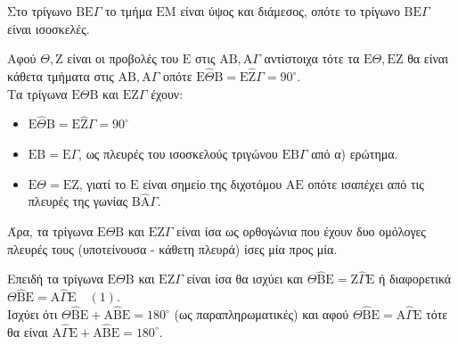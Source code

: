 \begin{alist}
    \item Στο τρίγωνο $\mathrm{B}\mathrm{E}\Gamma$ το τμήμα $\mathrm{E}\mathrm{M}$ είναι ύψος και διάμεσος, οπότε το τρίγωνο $\mathrm{B}\mathrm{E}\Gamma$ είναι ισοσκελές.

    \item Αφού $\Theta, \mathrm{Z}$ είναι οι προβολές του $\mathrm{E}$ στις $\mathrm{A}\mathrm{B}, \mathrm{A}\Gamma$ αντίστοιχα τότε τα $\mathrm{E}\Theta, \mathrm{E}\mathrm{Z}$ θα είναι κάθετα τμήματα στις $\mathrm{A}\mathrm{B}, \mathrm{A}\Gamma$ οπότε $\mathrm{E}\hat{\Theta}\mathrm{B} = \mathrm{E}\hat{\mathrm{Z}}\Gamma = 90^\circ$. \\
    Τα τρίγωνα $\mathrm{E}\Theta\mathrm{B}$ και $\mathrm{E}\mathrm{Z}\Gamma$ έχουν:
    \begin{itemize}
        \item $\mathrm{E}\hat{\Theta}\mathrm{B} = \mathrm{E}\hat{\mathrm{Z}}\Gamma = 90^\circ$
        \item $\mathrm{E}\mathrm{B} = \mathrm{E}\Gamma$, ως πλευρές του ισοσκελούς τριγώνου $\mathrm{E}\mathrm{B}\Gamma$ από α) ερώτημα.
        \item $\mathrm{E}\Theta = \mathrm{E}\mathrm{Z}$, γιατί το $\mathrm{E}$ είναι σημείο της διχοτόμου $\mathrm{A}\mathrm{E}$ οπότε ισαπέχει από τις πλευρές της γωνίας $\mathrm{B}\hat{\mathrm{A}}\Gamma$.
    \end{itemize}
    Άρα, τα τρίγωνα $\mathrm{E}\Theta\mathrm{B}$ και $\mathrm{E}\mathrm{Z}\Gamma$ είναι ίσα ως ορθογώνια που έχουν δυο ομόλογες πλευρές τους (υποτείνουσα - κάθετη πλευρά) ίσες μία προς μία.

    \item Επειδή τα τρίγωνα $\mathrm{E}\Theta\mathrm{B}$ και $\mathrm{E}\mathrm{Z}\Gamma$ είναι ίσα θα ισχύει και $\Theta\hat{\mathrm{B}}\mathrm{E} = \mathrm{Z}\hat{\Gamma}\mathrm{E}$ ή διαφορετικά $\Theta\hat{\mathrm{B}}\mathrm{E} = \mathrm{A}\hat{\Gamma}\mathrm{E} \quad (1)$. \\
    Ισχύει ότι $\Theta\hat{\mathrm{B}}\mathrm{E} + \mathrm{A}\hat{\mathrm{B}}\mathrm{E} = 180^\circ$ (ως παραπληρωματικές) και αφού $\Theta\hat{\mathrm{B}}\mathrm{E} = \mathrm{A}\hat{\Gamma}\mathrm{E}$ τότε θα είναι $\mathrm{A}\hat{\Gamma}\mathrm{E} + \mathrm{A}\hat{\mathrm{B}}\mathrm{E} = 180^\circ$.
\end{alist}
